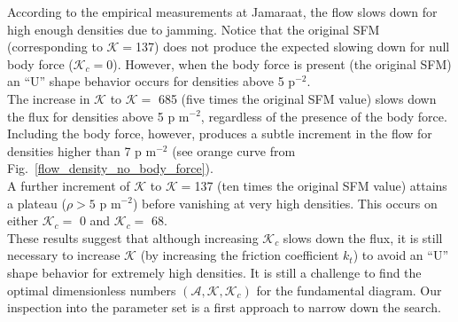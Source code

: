 \documentclass[preprint,12pt]{elsarticle}
\begin{document}
According to the empirical measurements at Jamaraat, the flow slows down for
high enough densities due to jamming. Notice that the original SFM
(corresponding to $\mathcal{K}=$137) does not produce the expected slowing down
for null body force ($\mathcal{K}_c=$0). However, when the body force is present
(the original SFM) an ``U'' shape behavior occurs for densities above 5
p$^{-2}$.\\

The increase in $\mathcal{K}$ to $\mathcal{K} = $ 685 (five times the original
SFM value) slows down  the flux for densities above 5 p m$^{-2}$, regardless of
the presence of the body force. Including the body force, however, produces a
subtle increment in the flow for densities higher than 7 p m$^{-2}$ (see orange
curve from Fig.~\ref{flow_density_no_body_force}). \\

A further increment of $\mathcal{K}$ to $\mathcal{K}=$137 (ten times the 
original SFM value) attains a plateau ($\rho>5$ p m$^{-2}$) before vanishing at 
very high densities. This occurs on either $\mathcal{K}_c=$ 0 and 
$\mathcal{K}_c = $ 68.\\


These results suggest that although increasing $\mathcal{K}_c$ slows down the
flux, it is still necessary to increase $\mathcal{K}$ (by increasing the
friction coefficient $k_t$) to avoid an ``U'' shape behavior for extremely high
densities. It is still a challenge to find the optimal dimensionless numbers
$(\mathcal{A},\mathcal{K},\mathcal{K}_c)$ for the fundamental diagram. Our
inspection into the parameter set is a first approach to narrow down the
search.\\
\end{document}
